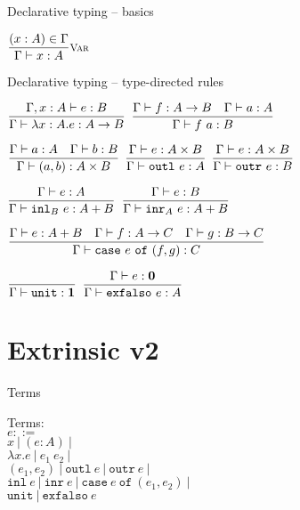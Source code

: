 \documentclass{beamer}
\newcommand{\pipe}{\ |\ }
\newcommand{\Fun}[2]{#1 \to #2}
\newcommand{\Prod}[2]{#1 \times #2}
\newcommand{\Sum}[2]{#1 + #2}
\newcommand{\Unit}{\textbf{1}}
\newcommand{\Empty}{\textbf{0}}
\newcommand{\annot}[2]{(#1 : #2)}
\newcommand{\fun}[2]{\lambda #1. #2}
\newcommand{\app}[2]{#1\ #2}
\newcommand{\pair}[2]{(#1, #2)}
\newcommand{\outl}[1][]{\texttt{outl}\ #1}
\newcommand{\outr}[1][]{\texttt{outr}\ #1}
\newcommand{\inl}[1][]{\texttt{inl}\ #1}
\newcommand{\inr}[1][]{\texttt{inr}\ #1}
\newcommand{\case}[3]{\texttt{case}\ #1\ \texttt{of}\ (#2, #3)}
\newcommand{\unit}{\texttt{unit}}
\newcommand{\exfalso}[1][]{\texttt{exfalso}\ #1}
\newcommand{\fulltyping}[3]{#1 \vdash #2 : #3}
\newcommand{\typing}[2]{\fulltyping{\Gamma}{#1}{#2}}
\newcommand{\infrule}[3][]{\displaystyle \frac{#2}{#3} \textsc{\footnotesize{#1}}}
\newcommand{\extend}[3]{#1, #2 : #3}
\newcommand{\sidecond}[1]{#1}
\begin{document}
\begin{frame}{Declarative typing -- basics}

\begin{center}
  $\infrule[Var]{\sidecond{(x : A) \in \Gamma}}{\typing{x}{A}}$
\end{center}

\end{frame}

\begin{frame}{Declarative typing -- type-directed rules}

\begin{center}
  $\infrule{\fulltyping{\extend{\Gamma}{x}{A}}{e}{B}}{\typing{\ifun{x}{A}{e}}{\Fun{A}{B}}}$ \quad
  $\infrule{\typing{f}{\Fun{A}{B}} \quad \typing{a}{A}}{\typing{\app{f}{a}}{B}}$

  \vspace{2em}

  $\infrule{\typing{a}{A} \quad \typing{b}{B}}{\typing{\pair{a}{b}}{\Prod{A}{B}}}$ \quad
  $\infrule{\typing{e}{\Prod{A}{B}}}{\typing{\outl[e]}{A}}$ \quad
  $\infrule{\typing{e}{\Prod{A}{B}}}{\typing{\outr[e]}{B}}$

  \vspace{2em}

  $\infrule{\typing{e}{A}}{\typing{\iinl{B}{e}}{\Sum{A}{B}}}$ \quad
  $\infrule{\typing{e}{B}}{\typing{\iinr{A}{e}}{\Sum{A}{B}}}$

  \vspace{2em}

  $\infrule{\typing{e}{\Sum{A}{B}} \quad \typing{f}{\Fun{A}{C}} \quad \typing{g}{\Fun{B}{C}}}{\typing{\case{e}{f}{g}}{C}}$

  \vspace{2em}

  $\infrule{}{\typing{\unit}{\Unit}}$ \quad
  $\infrule{\typing{e}{\Empty}}{\typing{\exfalso[e]}{A}}$
\end{center}

\end{frame}

\section{Extrinsic v2}

\begin{frame}{Terms}

Terms: \\
$e ::=$ \\
\qquad $x \pipe \annot{e}{A} \pipe$ \\
\qquad $\fun{x}{e} \pipe \app{e_1}{e_2} \pipe$ \\
\qquad $\pair{e_1}{e_2} \pipe \outl[e] \pipe \outr[e] \pipe$ \\
\qquad $\inl[e] \pipe \inr[e] \pipe \case{e}{e_1}{e_2} \pipe$ \\
\qquad $\unit \pipe \exfalso{e}$
  
\end{frame}
\end{document}
